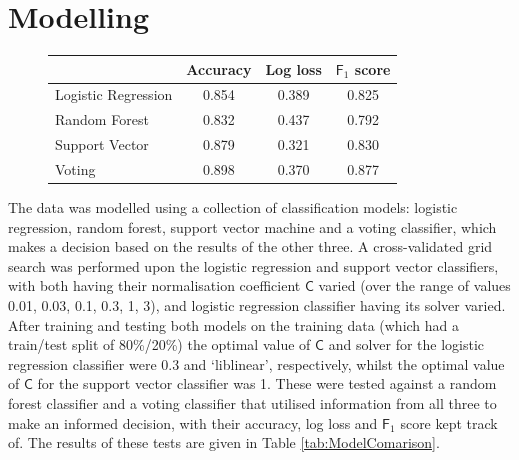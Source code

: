 \documentclass{article}
\begin{document}
    \section{Modelling}
    
    \begin{figure}[b]
        \centering
        \begin{tabular}{l | c | c | c}
            & Accuracy & Log loss & $\mathsf{F}_1$ score \\
            \hline
            Logistic Regression & 0.854 & 0.389 & 0.825 \\
            \hline
            Random Forest & 0.832 & 0.437 & 0.792 \\
            \hline
            Support Vector & 0.879 & 0.321 & 0.830 \\
            \hline
            Voting & 0.898 & 0.370 & 0.877
        \end{tabular}
    \end{figure}

    The data was modelled using a collection of classification models: logistic regression, random forest, support vector machine and a voting classifier, which makes a decision based on the results of the other three.
    A cross-validated grid search was performed upon the logistic regression and support vector classifiers, with both having their normalisation coefficient $\mathsf{C}$ varied (over the range of values 0.01, 0.03, 0.1, 0.3, 1, 3), and logistic regression classifier having its solver varied.
    After training and testing both models on the training data (which had a train/test split of 80\%/20\%) the optimal value of $\mathsf{C}$ and solver for the logistic regression classifier were 0.3 and `liblinear', respectively, whilst the optimal value of $\mathsf{C}$ for the support vector classifier was 1.
    These were tested against a random forest classifier and a voting classifier that utilised information from all three to make an informed decision, with their accuracy, log loss and $\mathsf{F}_1$ score kept track of. 
    The results of these tests are given in Table \ref{tab:ModelComarison}.\\

    
\end{document}
